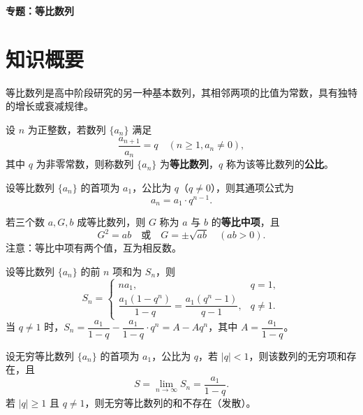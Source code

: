 \documentclass[11pt]{ctexrep}
\begin{document}
\begin{center}
    {\LARGE\bfseries 专题：等比数列}
\end{center}

\section*{知识概要}

等比数列是高中阶段研究的另一种基本数列，其相邻两项的比值为常数，具有独特的增长或衰减规律。

\begin{definition}[等比数列]
    设 $n$ 为正整数，若数列 $\{a_n\}$ 满足
    \[
        \frac{a_{n+1}}{a_n} = q \quad (n \geq 1, a_n \neq 0),
    \]
    其中 $q$ 为非零常数，则称数列 $\{a_n\}$ 为\textbf{等比数列}，$q$ 称为该等比数列的\textbf{公比}。
\end{definition}

\begin{property}[通项公式]
    设等比数列 $\{a_n\}$ 的首项为 $a_1$，公比为 $q$（$q \neq 0$），则其通项公式为
    \[
        a_n = a_1 \cdot q^{n-1}.
    \]
\end{property}

\begin{property}[等比中项]
    若三个数 $a, G, b$ 成等比数列，则 $G$ 称为 $a$ 与 $b$ 的\textbf{等比中项}，且
    \[
        G^2 = ab \quad \text{或} \quad G = \pm\sqrt{ab} \quad (ab > 0).
    \]
    注意：等比中项有两个值，互为相反数。
\end{property}

\begin{property}[前 $n$ 项和公式]
    设等比数列 $\{a_n\}$ 的前 $n$ 项和为 $S_n$，则
    \[
        S_n = \begin{cases}
            na_1, & q = 1, \\[6pt]
            \dfrac{a_1(1-q^n)}{1-q} = \dfrac{a_1(q^n-1)}{q-1}, & q \neq 1.
        \end{cases}
    \]
    当 $q \neq 1$ 时，$S_n = \dfrac{a_1}{1-q} - \dfrac{a_1}{1-q} \cdot q^n = A - Aq^n$，其中 $A = \dfrac{a_1}{1-q}$。
\end{property}

\begin{property}[无穷等比数列求和]
    设无穷等比数列 $\{a_n\}$ 的首项为 $a_1$，公比为 $q$，若 $|q| < 1$，则该数列的无穷项和存在，且
    \[
        S = \lim_{n \to \infty} S_n = \frac{a_1}{1-q}.
    \]
    若 $|q| \geq 1$ 且 $q \neq 1$，则无穷等比数列的和不存在（发散）。
\end{property}
\end{document}
